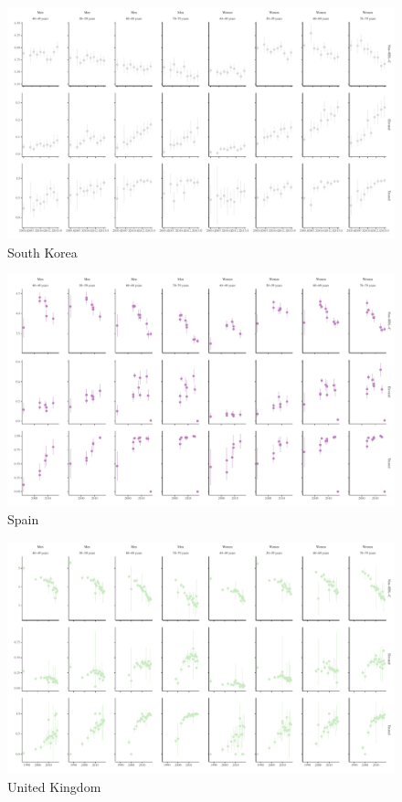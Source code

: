 \documentclass[12pt]{article}
\begin{document}
\begin{appendix}
\begin{landscape}
        \begin{figure}[H]
            \centering
            \includegraphics[width=\linewidth]{../3_figures/countries/fig_south korea.pdf}
            \caption{South Korea}
            \label{fig:korea}
        \end{figure}

        \begin{figure}[H]
            \centering
            \includegraphics[width=\linewidth]{../3_figures/countries/fig_spain.pdf}
            \caption{Spain}
            \label{fig:spain}
        \end{figure}

        \begin{figure}[H]
            \centering
            \includegraphics[width=\linewidth]{../3_figures/countries/fig_united kingdom.pdf}
            \caption{United Kingdom}
            \label{fig:uk}
        \end{figure}


\end{landscape}
\end{appendix}
\end{document}
